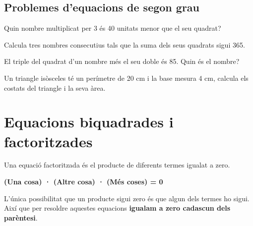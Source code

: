 \subsection{Problemes d'equacions de segon grau}

\begin{mylist}
	
	
	\exer  Quin nombre multiplicat per 3 és 40 unitats menor que el seu quadrat?
	
	
	\exer  Calcula tres nombres consecutius tals que la suma dels seus quadrats sigui 365.
	
	
	\exer  El triple del quadrat d'un nombre més el seu doble és 85. Quin és el nombre?
	
	
	\exer  Un triangle isòsceles té un perímetre de 20 cm i la base mesura 4 cm, calcula els costats del triangle i la seva àrea.
	
\end{mylist}	


\section{ Equacions biquadrades i factoritzades}


\begin{theorybox}

 Una equació factoritzada és el producte de diferents termes igualat a zero.
 
 \begin{center}
 \textbf{                                     
	(Una cosa) · (Altre cosa) · (Més coses) = 0} 
\end{center}

L'única possibilitat que un producte sigui zero és que algun dels termes ho sigui. Així que per resoldre aquestes equacions \textbf{igualam a zero cadascun dels parèntesi}.
\end{theorybox}


